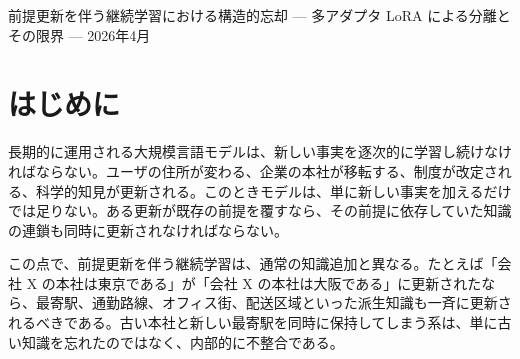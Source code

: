 \documentclass[12pt,a4paper]{article}
\begin{document}
\PaperTitleBlock
  {前提更新を伴う継続学習における構造的忘却}
  {--- 多アダプタ LoRA による分離とその限界 ---}
  {2026年4月}

\begin{abstract}
逐次的な知識更新を受ける大規模言語モデルでは、破滅的忘却が繰り返し観測される。しかし、すべての忘却が同じではない。新しい事実が既存の前提を覆すとき、単一の事実だけでなく、その前提に依存していた派生知識も同時に無効化され、再構成されなければならない。本稿では、この種の忘却を前提更新依存的な構造的忘却として捉える。

そのために、本稿では明示的な前提--帰結依存を持つ合成ベンチマークを構成し、逐次タスクのもとで三つの LoRA 条件を比較する。第一は再提示ベースの E-lite、第二は前提 DAG を用いて依存知識を選択的に再提示する F-v2c、第三は現在知識と過去知識を別アダプタに分離する F-multi である。7 モデル・4 系統の比較により、次の結果を得る。第一に、テストした全条件・全系統で、最初の前提更新以降に T2 collapse が一貫して現れ、LoRA は蓄積ではなく上書きとして振る舞う。第二に、F-v2c は後半タスクの依存整合性を改善し、単純な再提示だけでは到達できない水準に安定的に到達する。第三に、F-multi は旧タスク保持を初めて非ゼロにし、保持と更新の単純なトレードオフを部分的に破る。第四に、それでも保持アダプタの絶対性能は低く、パラメータ水準での保存には限界がある。

本稿の主張は、LoRA ベース継続学習が無効だということではない。主張は、前提更新を伴う知識更新において、本実験条件ではパラメータ的な更新だけでは高忠実度の長期保持を達成しにくいということである。多アダプタ分離は一定の救済を与えるが、それは長期的な知識整合性の維持の十分条件ではない。
\end{abstract}

\section{はじめに}

長期的に運用される大規模言語モデルは、新しい事実を逐次的に学習し続けなければならない。ユーザの住所が変わる、企業の本社が移転する、制度が改定される、科学的知見が更新される。このときモデルは、単に新しい事実を加えるだけでは足りない。ある更新が既存の前提を覆すなら、その前提に依存していた知識の連鎖も同時に更新されなければならない。

この点で、前提更新を伴う継続学習は、通常の知識追加と異なる。たとえば「会社 X の本社は東京である」が「会社 X の本社は大阪である」に更新されたなら、最寄駅、通勤路線、オフィス街、配送区域といった派生知識も一斉に更新されるべきである。古い本社と新しい最寄駅を同時に保持してしまう系は、単に古い知識を忘れたのではなく、内部的に不整合である。
\end{document}
